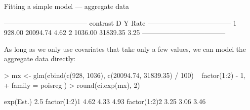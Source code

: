 \begin{frame}[fragile]{Fitting a simple model --- aggregate data}
\begin{Schunk}
\begin{Soutput}
 ------------------------------------ 
 contrast         D        Y    Rate  
 ------------------------------------ 
 1           928.00 20094.74    4.62  
 2          1036.00 31839.35    3.25  
 ------------------------------------ 
\end{Soutput}
\end{Schunk}
\vspace*{-1em}
As long as we only use covariates that take only a few values, we can
model the aggregate data directly:
\begin{Schunk}
\begin{Sinput}
> mx <- glm(cbind(c(928, 1036), c(20094.74, 31839.35) / 100) ~ factor(1:2) - 1,
+           family = poisreg )
> round(ci.exp(mx), 2)
\end{Sinput}
\begin{Soutput}
             exp(Est.) 2.5%
factor(1:2)1      4.62 4.33  4.93
factor(1:2)2      3.25 3.06  3.46
\end{Soutput}
\end{Schunk}
\end{frame}
